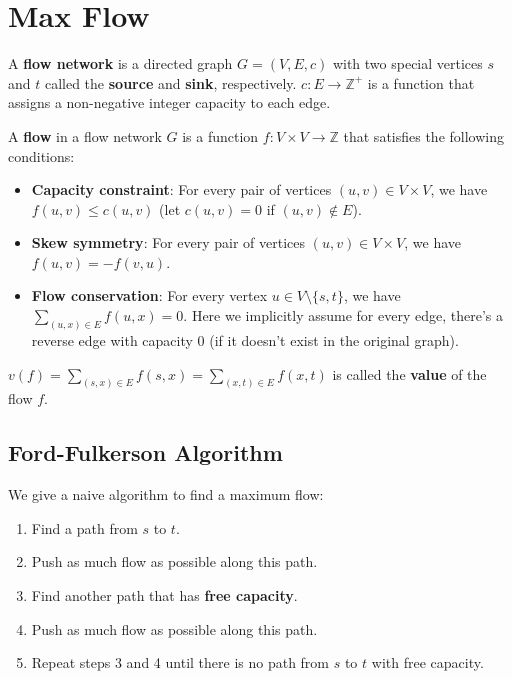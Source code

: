 \chapter{Max Flow} \label{chap:maxflow}

\begin{definition}
	A \textbf{flow network} is a directed graph $G = (V, E, c)$ with two special vertices $s$ and $t$ called the \textbf{source} and \textbf{sink}, respectively. $c: E \to \mathbb{Z}^+$ is a function that assigns a non-negative integer capacity to each edge.
\end{definition}

\begin{definition}[Flow]
	A \textbf{flow} in a flow network $G$ is a function $f: V\times V \to \mathbb{Z}$ that satisfies the following conditions:
	\begin{itemize}
		\item \textbf{Capacity constraint}: For every pair of vertices $(u, v) \in V\times V$, we have $f(u, v) \leq c(u, v)$ (let $c(u, v) = 0$ if $(u, v) \notin E$).
		\item \textbf{Skew symmetry}: For every pair of vertices $(u, v) \in V\times V$, we have $f(u, v) = -f(v, u)$.
		\item \textbf{Flow conservation}: For every vertex $u \in V\setminus\{s, t\}$, we have $\sum_{(u,x) \in E} f(u, x) = 0$. Here we implicitly assume for every edge, there's a reverse edge with capacity 0 (if it doesn't exist in the original graph).
	\end{itemize}
	$v(f) = \sum_{(s, x) \in E} f(s, x) = \sum_{(x, t) \in E} f(x, t)$ is called the \textbf{value} of the flow $f$.
\end{definition}

\section{Ford-Fulkerson Algorithm}

We give a naive algorithm to find a maximum flow:

\begin{enumerate}
	\item Find a path from $s$ to $t$.
	\item Push as much flow as possible along this path.
	\item Find another path that has \textbf{free capacity}.
	\item Push as much flow as possible along this path.
	\item Repeat steps 3 and 4 until there is no path from $s$ to $t$ with free capacity.
\end{enumerate}


